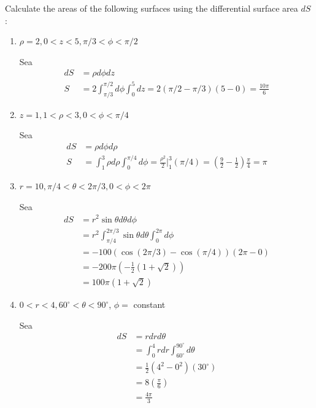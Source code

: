 \begin{problema}
    Calculate the areas of the following surfaces using the differential surface area $d S$ :

    \begin{enumerate}
        \item $\rho=2,0<z<5, \pi / 3<\phi<\pi / 2$
        \begin{sol}
            Sea 
            \begin{align*}
                dS &= \rho d\phi dz\\
                S &= 2 \int_{\pi/3}^{\pi/2}d\phi \int_0^5dz = 2\left(\pi/2-\pi/3\right)(5-0)=\frac{10\pi}{6}
            \end{align*}
        \end{sol}
        \item $z=1,1<\rho<3,0<\phi<\pi / 4$
        \begin{sol}
            Sea
            \begin{align*}
                dS &= \rho d\phi d\rho\\
                S &= \int_1^3\rho d\rho\int_0^{\pi/4} d\phi= \frac{\rho^2}{2}\Big|_1^3(\pi/4)= \left(\frac{9}{2}-\frac{1}{2}\right)\frac{\pi}{4}=\pi 
            \end{align*}
        \end{sol}
        \item $r=10, \pi / 4<\theta<2 \pi / 3,0<\phi<2 \pi$
        \begin{sol}
            Sea 
            \begin{align*}
                dS &= r^2\sin\theta d\theta d\phi\\
                    &= r^2 \int_{\pi/4}^{2\pi/3}\sin \theta d\theta\int_0^{2\pi}d\phi\\
                    &= -100(\cos\left(2\pi/3\right)-\cos\left(\pi/4\right))(2\pi -0)\\
                    &= -200\pi\left(-\frac{1}{2}(1+\sqrt{2})\right)\\
                    &=100\pi(1+\sqrt{2})
            \end{align*}
        \end{sol}
        \item  $0<r<4,60^{\circ}<\theta<90^{\circ}$, $\phi=$ constant
        \begin{sol}
            Sea
            \begin{align*}
                dS &= rdrd\theta\\
                    &=\int_0^4 r dr \int_{60^\circ}^{90^\circ}d\theta\\
                    &= \frac{1}{2}(4^2-0^2)(30^\circ)\\
                    &= 8\left(\frac{\pi}{6}\right)\\
                    &= \frac{4\pi}{3}
            \end{align*}
        \end{sol}
    \end{enumerate}

\end{problema}

